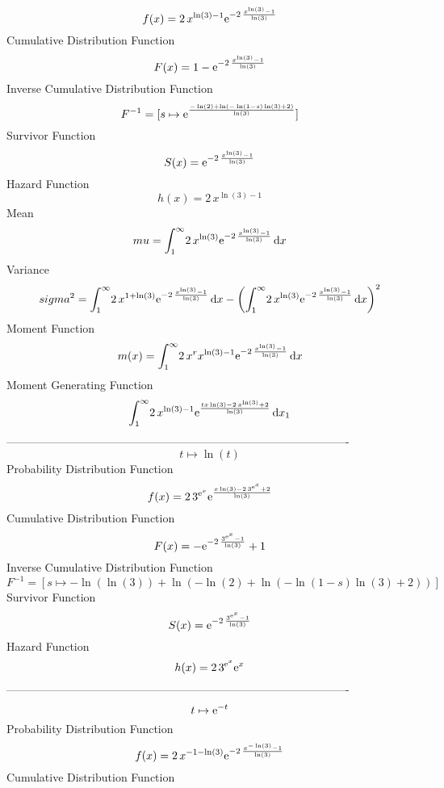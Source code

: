 \documentclass[12pt]{article}
\begin{document}
$$  f(x)=2\,{x}^{\ln  \left( 3 \right) -1}{{\rm e}^{-2\,{\frac {{x}^{\ln 
 \left( 3 \right) }-1}{\ln  \left( 3 \right) }}}}
$$Cumulative Distribution Function  
 $$F(x)=1-{{\rm e}^{-2\,{\frac {{x}^{\ln  \left( 3 \right) }-1}{\ln  \left( 3
 \right) }}}}
$$ Inverse Cumulative Distribution Function 
  $$F^{-1} = [s\mapsto {{\rm e}^{{\frac {-\ln  \left( 2 \right) +\ln  \left( -\ln 
 \left( 1-s \right) \ln  \left( 3 \right) +2 \right) }{\ln  \left( 3
 \right) }}}}]
$$Survivor Function 
 $$ S(x)={{\rm e}^{-2\,{\frac {{x}^{\ln  \left( 3 \right) }-1}{\ln  \left( 3
 \right) }}}}
$$ Hazard Function 
 $$ h(x)=2\,{x}^{\ln  \left( 3 \right) -1}
$$Mean 
 $$ mu=\int_{1}^{\infty }\!2\,{x}^{\ln  \left( 3 \right) }{{\rm e}^{-2\,{
\frac {{x}^{\ln  \left( 3 \right) }-1}{\ln  \left( 3 \right) }}}}
\,{\rm d}x
$$ Variance 
 $$ sigma^2 = \int_{1}^{\infty }\!2\,{x}^{1+\ln  \left( 3 \right) }{{\rm e}^{-2\,{
\frac {{x}^{\ln  \left( 3 \right) }-1}{\ln  \left( 3 \right) }}}}
\,{\rm d}x- \left( \int_{1}^{\infty }\!2\,{x}^{\ln  \left( 3 \right) }
{{\rm e}^{-2\,{\frac {{x}^{\ln  \left( 3 \right) }-1}{\ln  \left( 3
 \right) }}}}\,{\rm d}x \right) ^{2}
$$Moment Function 
 $$ m(x) = \int_{1}^{\infty }\!2\,{x}^{r}{x}^{\ln  \left( 3 \right) -1}{{\rm e}^{
-2\,{\frac {{x}^{\ln  \left( 3 \right) }-1}{\ln  \left( 3 \right) }}}}
\,{\rm d}x
$$ Moment Generating Function 
 $$\int_{1}^{\infty }\!2\,{x}^{\ln  \left( 3 \right) -1}{{\rm e}^{{\frac 
{tx\ln  \left( 3 \right) -2\,{x}^{\ln  \left( 3 \right) }+2}{\ln 
 \left( 3 \right) }}}}\,{\rm d}x_{{1}}
$$-------------------------------------------------------------------------------------------  \\$$t\mapsto \ln  \left( t \right) 
$$Probability Distribution Function 
$$  f(x)=2\,{3}^{{{\rm e}^{x}}}{{\rm e}^{{\frac {x\ln  \left( 3 \right) -2\,{3}
^{{{\rm e}^{x}}}+2}{\ln  \left( 3 \right) }}}}
$$Cumulative Distribution Function  
 $$F(x)=-{{\rm e}^{-2\,{\frac {{3}^{{{\rm e}^{x}}}-1}{\ln  \left( 3 \right) }}
}}+1
$$ Inverse Cumulative Distribution Function 
  $$F^{-1} = [s\mapsto -\ln  \left( \ln  \left( 3 \right)  \right) +\ln  \left( -
\ln  \left( 2 \right) +\ln  \left( -\ln  \left( 1-s \right) \ln 
 \left( 3 \right) +2 \right)  \right) ]
$$Survivor Function 
 $$ S(x)={{\rm e}^{-2\,{\frac {{3}^{{{\rm e}^{x}}}-1}{\ln  \left( 3 \right) }}}
}
$$ Hazard Function 
 $$ h(x)=2\,{3}^{{{\rm e}^{x}}}{{\rm e}^{x}}
$$-------------------------------------------------------------------------------------------  \\$$t\mapsto {{\rm e}^{-t}}
$$Probability Distribution Function 
$$  f(x)=2\,{x}^{-1-\ln  \left( 3 \right) }{{\rm e}^{-2\,{\frac {{x}^{-\ln 
 \left( 3 \right) }-1}{\ln  \left( 3 \right) }}}}
$$Cumulative Distribution Function  
\end{document}
